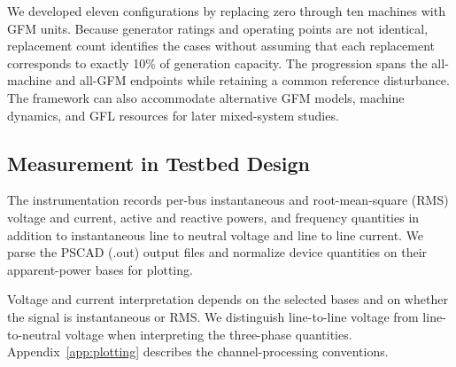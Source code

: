 \documentclass[11pt]{article}
\begin{document}
We developed eleven configurations by replacing zero through ten machines with GFM units. Because generator ratings and operating points are not identical, replacement count identifies the cases without assuming that each replacement corresponds to exactly 10\% of generation capacity. The progression spans the all-machine and all-GFM endpoints while retaining a common reference disturbance. The framework can also accommodate alternative GFM models, machine dynamics, and GFL resources for later mixed-system studies.

\subsection{Measurement in Testbed Design}
The instrumentation records per-bus instantaneous and root-mean-square (RMS) voltage and current, active and reactive powers, and frequency quantities in addition to instantaneous line to neutral voltage and line to line current. We parse the PSCAD (.out) output files and normalize device quantities on their apparent-power bases for plotting.

Voltage and current interpretation depends on the selected bases and on whether the signal is instantaneous or RMS. We distinguish line-to-line voltage from line-to-neutral voltage when interpreting the three-phase quantities.  Appendix~\ref{app:plotting} describes the channel-processing conventions.
\end{document}
